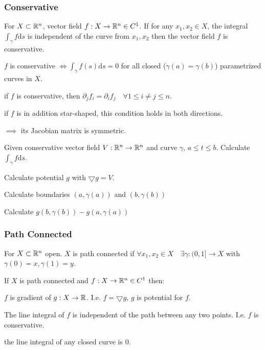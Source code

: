 \subsubsection{Conservative}
For $X \subset \mathbb{R}^n$, vector field $f: X \to \mathbb{R}^n \in C^1$. If for any $x_1, x_2 \in X$, the integral $\int_{\gamma} f \mathrm{d}s$ is independent of the curve from $x_1, x_2$ then the vector field $f$ is conservative.

\begin{compactitem}
    \item $f$ is conservative $\iff \int_{\gamma} f(s) \mathrm{d}s = 0$ for all closed ($\gamma(a) = \gamma(b)$) parametrized curves in $X$.
    \item if $f$ is conservative, then $\partial_j f_i = \partial_i f_j \quad \forall 1 \le i \neq j \le n$.
        \begin{compactitem}
            \item if $f$ is in addition star-shaped, this condition holds in both directions.
            \item $\implies$ its Jacobian matrix is symmetric.
        \end{compactitem}
\end{compactitem}

Given conservative vector field $V: \mathbb{R}^n \to \mathbb{R}^n$ and curve $\gamma$, $a \le t \le b$. Calculate $\int_{\gamma} f \mathrm{d}s$.

\begin{compactitem}
    \item Calculate potential $g$ with $\bigtriangledown g = V$.
    \item Calculate boundaries $(a, \gamma(a))$ and $(b, \gamma(b))$
    \item Calculate $g(b, \gamma(b)) - g(a, \gamma(a))$
\end{compactitem}


\subsubsection{Path Connected}
For $X \subset \mathbb{R}^n$ open. $X$ is path connected if $\forall x_1, x_2 \in X \quad \exists \gamma: (0, 1] \to X$ with $\gamma(0) = x, \gamma(1) = y$.

If $X$ is path connected and $f: X \to \mathbb{R}^n \in C^1$ then:
\begin{compactitem}
    \item $f$ is gradient of $g: X \to \mathbb{R}$. I.e. $f = \bigtriangledown g$, $g$ is potential for $f$.
    \item The line integral of $f$ is independent of the path between any two points. I.e. $f$ is conservative.
    \item the line integral of any closed curve is $0$.
\end{compactitem}

